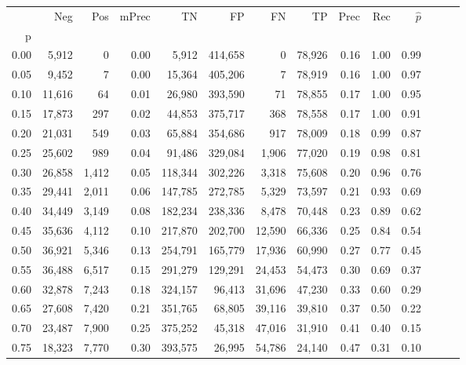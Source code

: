 \begin{tabular}{rrrrrrrrrrrrrr}
\toprule
{} &     Neg &    Pos & mPrec &       TN &       FP &      FN &      TP &  Prec &   Rec & $\hat{p}$ \\
p    &         &        &       &          &          &         &         &       &       &           \\
\midrule
0.00 &   5,912 &      0 &  0.00 &    5,912 &  414,658 &       0 &  78,926 &  0.16 &  1.00 &      0.99 \\
0.05 &   9,452 &      7 &  0.00 &   15,364 &  405,206 &       7 &  78,919 &  0.16 &  1.00 &      0.97 \\
0.10 &  11,616 &     64 &  0.01 &   26,980 &  393,590 &      71 &  78,855 &  0.17 &  1.00 &      0.95 \\
0.15 &  17,873 &    297 &  0.02 &   44,853 &  375,717 &     368 &  78,558 &  0.17 &  1.00 &      0.91 \\
0.20 &  21,031 &    549 &  0.03 &   65,884 &  354,686 &     917 &  78,009 &  0.18 &  0.99 &      0.87 \\
0.25 &  25,602 &    989 &  0.04 &   91,486 &  329,084 &   1,906 &  77,020 &  0.19 &  0.98 &      0.81 \\
0.30 &  26,858 &  1,412 &  0.05 &  118,344 &  302,226 &   3,318 &  75,608 &  0.20 &  0.96 &      0.76 \\
0.35 &  29,441 &  2,011 &  0.06 &  147,785 &  272,785 &   5,329 &  73,597 &  0.21 &  0.93 &      0.69 \\
0.40 &  34,449 &  3,149 &  0.08 &  182,234 &  238,336 &   8,478 &  70,448 &  0.23 &  0.89 &      0.62 \\
0.45 &  35,636 &  4,112 &  0.10 &  217,870 &  202,700 &  12,590 &  66,336 &  0.25 &  0.84 &      0.54 \\
0.50 &  36,921 &  5,346 &  0.13 &  254,791 &  165,779 &  17,936 &  60,990 &  0.27 &  0.77 &      0.45 \\
0.55 &  36,488 &  6,517 &  0.15 &  291,279 &  129,291 &  24,453 &  54,473 &  0.30 &  0.69 &      0.37 \\
0.60 &  32,878 &  7,243 &  0.18 &  324,157 &   96,413 &  31,696 &  47,230 &  0.33 &  0.60 &      0.29 \\
0.65 &  27,608 &  7,420 &  0.21 &  351,765 &   68,805 &  39,116 &  39,810 &  0.37 &  0.50 &      0.22 \\
0.70 &  23,487 &  7,900 &  0.25 &  375,252 &   45,318 &  47,016 &  31,910 &  0.41 &  0.40 &      0.15 \\
0.75 &  18,323 &  7,770 &  0.30 &  393,575 &   26,995 &  54,786 &  24,140 &  0.47 &  0.31 &      0.10 \\

\end{tabular}
